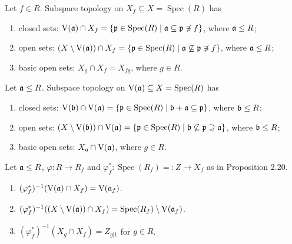 \begin{corollary}
    Let $f \in R$. Subspace topology on $X_f \subseteq X = \operatorname{Spec}(R)$ has 
    \begin{enumerate}
        \item closed sets: $\operatorname{V}(\mathfrak{a}) \cap X_f = \{\mathfrak{p} \in \operatorname{Spec}(R) \mid \mathfrak{a} \subseteq \mathfrak{p} \not \ni f\}$, where $\mathfrak{a} \leq R$;
        \item open sets: $(X \setminus \operatorname{V}(\mathfrak{a})) \cap X_f = \{\mathfrak{p} \in \operatorname{Spec}(R) \mid \mathfrak{a} \not \subseteq \mathfrak{p} \not \ni f\}$, where $\mathfrak{a} \leq R$;
        \item basic open sets: $X_g \cap X_f = X_{fg}$, where $g \in R$.
    \end{enumerate}
\end{corollary}

\begin{remark}
    Let $\mathfrak{a} \leq R$. Subspace topology on $\operatorname{V}(\mathfrak{a}) \subseteq X = \operatorname{Spec}(R)$ has 
    \begin{enumerate}
        \item closed sets: $\operatorname{V}(\mathfrak{b}) \cap \operatorname{V}(\mathfrak{a}) = \{\mathfrak{p} \in \operatorname{Spec}(R) \mid \mathfrak{b} + \mathfrak{a} \subseteq \mathfrak{p}\}$, where $\mathfrak{b} \leq R$;
        \item open sets: $(X \setminus \operatorname{V}(\mathfrak{b})) \cap \operatorname{V}(\mathfrak{a}) = \{\mathfrak{p} \in \operatorname{Spec}(R) \mid \mathfrak{b} \not \subseteq \mathfrak{p} \supseteq \mathfrak{a}\}$, where $\mathfrak{b} \leq R$;
        \item basic open sets: $X_g \cap \operatorname{V}(\mathfrak{a})$, where $g \in R$.
    \end{enumerate}
\end{remark}

\begin{proposition}
    Let $\mathfrak{a} \leq R$, $\varphi: R \to R_f$ and $\varphi_f^*: \operatorname{Spec}(R_f) =: Z \to X_f$ as in Proposition 2.20. 
    \begin{enumerate}
        \item 
            $(\varphi_f^*)^{-1}(\operatorname{V}(\mathfrak{a}) \cap X_f) = \operatorname{V}(\mathfrak{a}_f)$. 
        \item
            $(\varphi_f^*)^{-1}((X \setminus \operatorname{V}(\mathfrak{a})) \cap X_f) = \operatorname{Spec}(R_f) \setminus \operatorname{V}(\mathfrak{a}_f)$.
        \item 
            $(\varphi_f^*)^{-1}(X_g \cap X_f) = Z_{g|1}$ for $g \in R$.
    \end{enumerate}
\end{proposition}

